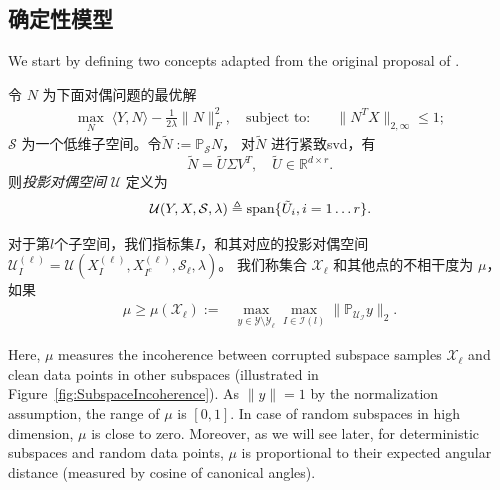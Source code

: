 \documentclass{ctexart}
\begin{document}
\subsection{确定性模型}
We start by defining two concepts adapted from the original proposal of \cite{soltanolkotabi2011geometric}.
\begin{definition}[投影对偶空间]\label{def:proj_dual_direction}
  令 $N$ 为下面对偶问题的最优解
  \begin{align*}
    \max_{N} \; \langle Y, N \rangle - \frac{1}{2\lambda}\| N
    \|_F^2,\quad\text{subject to:}\quad &\|N^T X\|_{2, \infty} \leq 1;
  \end{align*}
  $\mathcal{S}$ 为一个低维子空间。令$ \tilde{N} := \mathbb{P}_{\mathcal{S}} N$，
  对$\tilde{N}$ 进行紧致svd，有
  $$ \tilde{N} = \tilde{U} \Sigma V^T, \quad \tilde{U} \in \mathbb{R}^{d \times r}. $$
  则{\em 投影对偶空间} $\mathcal{U}$ 定义为
  $$\mathcal{U}(Y,X,\mathcal{S},\lambda)\triangleq \mathrm{span} \{ \tilde{U}_i, i = 1\dots r \}.$$
\end{definition}


\begin{definition}[投影子空间的非相干性]\label{def:incoherence}
  对于第$l$个子空间，我们指标集$I$，和其对应的投影对偶空间
  $\mathcal{U}_I^{(\ell)}=\mathcal{U}(X_I^{(\ell)},X_{I^c}^{(\ell)},\mathcal{S}_{\ell},\lambda)$。
  我们称集合 $\mathcal{X}_{\ell}$ 和其他点的不相干度为 $\mu$，如果
  \begin{align*}
    \mu\geq \mu(\mathcal{X}_{\ell}) := &\max_{y\in \mathcal{Y}\setminus \mathcal{Y}_{\ell}}
    \max_{I \in \mathcal{I}(l)} \|\mathbb{P}_{\mathcal{U_I}} y\|_2.
  \end{align*}
\end{definition}
%

Here, $\mu$ measures the incoherence between corrupted subspace samples $\mathcal{X}_{\ell}$ and clean data points in other subspaces (illustrated in Figure~\ref{fig:SubspaceIncoherence}). As $\|y\|=1$ by the normalization assumption, the range of $\mu$ is $[0,1]$. In case of random subspaces in high dimension, $\mu$ is close to zero. Moreover, as we will see later, for deterministic subspaces and random data points, $\mu$ is proportional to their expected angular distance (measured by cosine of canonical angles).
\end{document}
